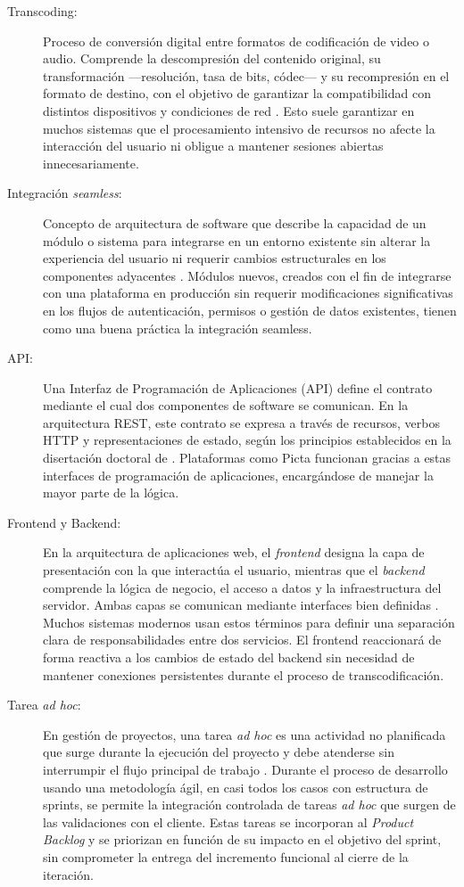 \begin{description}
  \item[Transcoding:] Proceso de conversión digital entre formatos de codificación de video o audio.
  Comprende la descompresión del contenido original, su transformación ---resolución, tasa de bits,
  códec--- y su recompresión en el formato de destino, con el objetivo de garantizar la
  compatibilidad con distintos dispositivos y condiciones de red \citep{Richardson2003}.
  Esto suele garantizar en muchos sistemas que el procesamiento intensivo de recursos no afecte la 
  interacción del usuario ni obligue a mantener sesiones abiertas innecesariamente.

  \item[Integración \textit{seamless}:] Concepto de arquitectura de software que describe la
  capacidad de un módulo o sistema para integrarse en un entorno existente sin alterar la experiencia
  del usuario ni requerir cambios estructurales en los componentes adyacentes
  \citep{Zhuk2004}. Módulos nuevos, creados con el fin de integrarse con una plataforma en producción sin requerir
  modificaciones significativas en los flujos de autenticación, permisos o gestión de datos existentes, tienen como 
  una buena práctica la integración seamless.

  \item[API:] Una Interfaz de Programación de Aplicaciones (API) define el contrato mediante el
  cual dos componentes de software se comunican. En la arquitectura REST, este contrato se expresa a
  través de recursos, verbos HTTP y representaciones de estado, según los principios establecidos
  en la disertación doctoral de \citet{Fielding2000}. Plataformas como Picta funcionan gracias a estas interfaces
  de programación de aplicaciones, encargándose de manejar la mayor parte de la lógica.

  \item[Frontend y Backend:] En la arquitectura de aplicaciones web, el \textit{frontend} designa
  la capa de presentación con la que interactúa el usuario, mientras que el \textit{backend}
  comprende la lógica de negocio, el acceso a datos y la infraestructura del servidor. Ambas capas
  se comunican mediante interfaces bien definidas \citep{Richards2020}. Muchos sistemas modernos usan estos términos para
  definir una separación clara de responsabilidades entre dos servicios. El frontend reaccionará
  de forma reactiva a los cambios de estado del backend sin necesidad de mantener conexiones persistentes durante el proceso de transcodificación.

  \item[Tarea \textit{ad hoc}:] En gestión de proyectos, una tarea \textit{ad hoc} es una actividad
  no planificada que surge durante la ejecución del proyecto y debe atenderse sin interrumpir el
  flujo principal de trabajo \citep{Wysocki2019}. Durante el proceso de desarrollo usando una metodología ágil, en casi todos los casos con estructura de sprints,
  se permite  la integración controlada de tareas \textit{ad hoc} que surgen de las validaciones con el
  cliente. Estas tareas se incorporan al \textit{Product Backlog} y se priorizan en función de su
  impacto en el objetivo del sprint, sin comprometer la entrega del incremento funcional al cierre de
  la iteración.


\end{description}
